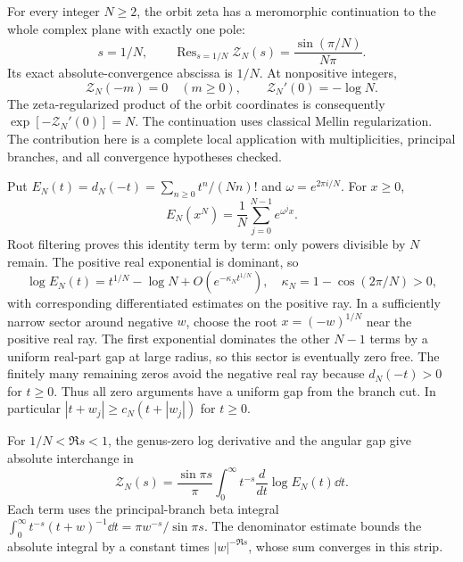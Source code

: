 For every integer $N\ge2$, the orbit zeta has a meromorphic continuation to
the whole complex plane with exactly one pole:
\[
\boxed{s=1/N,\qquad
\operatorname{Res}_{s=1/N}\mathcal Z_N(s)=\frac{\sin(\pi/N)}{N\pi}.}
\]
Its exact absolute-convergence abscissa is $1/N$. At nonpositive integers,
\[
\boxed{\mathcal Z_N(-m)=0\quad(m\ge0),\qquad
\mathcal Z_N'(0)=-\log N.}
\]
The zeta-regularized product of the orbit coordinates is consequently
$\exp[-\mathcal Z_N'(0)]=N$.
The continuation uses classical Mellin regularization. The contribution here is a complete local application with multiplicities,
principal branches, and all convergence hypotheses checked.

Put $E_N(t)=d_N(-t)=\sum_{n\ge0}t^n/(Nn)!$ and
$\omega=e^{2\pi i/N}$. For $x\ge0$,
\[
E_N(x^N)=\frac1N\sum_{j=0}^{N-1}e^{\omega^jx}.
\]
Root filtering proves this identity term by term: only powers divisible by
$N$ remain. The positive real exponential is dominant, so
\[
\log E_N(t)=t^{1/N}-\log N+O(e^{-\kappa_N t^{1/N}}),
\quad \kappa_N=1-\cos(2\pi/N)>0,
\]
with corresponding differentiated estimates on the positive ray.
In a sufficiently narrow sector around negative $w$, choose the root
$x=(-w)^{1/N}$ near the positive real ray. The first exponential dominates
the other $N-1$ terms by a uniform real-part gap at large radius, so this
sector is eventually zero free. The finitely many remaining zeros avoid
the negative real ray because $d_N(-t)>0$ for $t\ge0$.
Thus all zero arguments have a uniform gap from the branch cut.
In particular $|t+w_j|\ge c_N(t+|w_j|)$ for $t\ge0$.

For $1/N<\Re s<1$, the genus-zero log derivative and the angular gap give
absolute interchange in
\[
\mathcal Z_N(s)=\frac{\sin\pi s}{\pi}
\int_0^\infty t^{-s}\frac{d}{dt}\log E_N(t)\dd t.
\]
Each term uses the principal-branch beta integral
$\int_0^\infty t^{-s}(t+w)^{-1}\dd t=\pi w^{-s}/\sin\pi s$.
The denominator estimate bounds the absolute integral by a constant times
$|w|^{-\Re s}$, whose sum converges in this strip.

